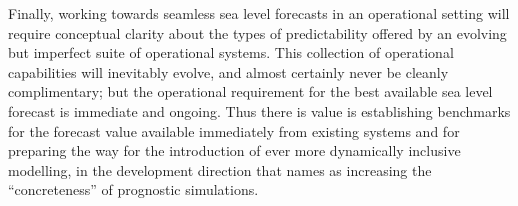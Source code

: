 Finally, working towards seamless sea level forecasts in an operational setting will require conceptual clarity about the types of predictability offered by an evolving but imperfect suite of operational systems. 
This collection of operational capabilities will inevitably evolve, and almost certainly never be cleanly complimentary; but the operational requirement for the best available sea level forecast is immediate and ongoing. 
Thus there is value is establishing benchmarks for the forecast value available immediately from existing systems and for preparing the way for the introduction of ever more dynamically inclusive modelling, in the development direction that \citet{Petersen:2012tr} names as increasing the ``concreteness'' of prognostic simulations.
